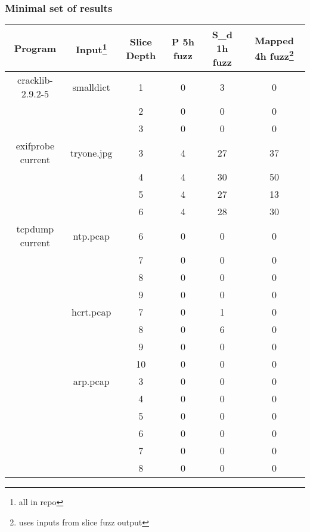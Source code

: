 \documentclass{beamer}
\begin{document}
\frame
{
	\frametitle{Minimal set of results}
	\tiny

	
	\begin{center}
	\begin{tabular}{| c | c | c  | c | c | c |}
	\hline
	Program            & Input\footnote{all in repo}        & Slice Depth  & P 5h fuzz & S\_d 1h fuzz & Mapped 4h fuzz\footnote{uses inputs from slice fuzz output} \\ \hline
	cracklib-2.9.2-5 & smalldict   &  1                 & 0             & 3                    & 0  \\
	                 	&                  &  2 		  & 0 		   & 0 			& 0  \\
	                 	&             	   & 	3 		 & 0 		   & 0 			& 0  \\ \hline
	exifprobe current & tryone.jpg & 3 		 & 4 		   & 27 			& 37  \\ 
	                  &            & 4 & 4 & 30 & 50  \\ 
	                  &            & 5 & 4 & 27 & 13  \\ 
	                  &            & 6 & 4 & 28 & 30  \\ \hline
	tcpdump current   & ntp.pcap   & 6 & 0 & 0 & 0   \\ 
	                  &   & 7 & 0 & 0 & 0   \\ 
	                  &    & 8 & 0 & 0 & 0   \\ 
	                  &    & 9 & 0 & 0 & 0   \\ \cline{2-6}
                      & hcrt.pcap  & 7 & 0 & 1 & 0   \\
                      &            & 8 & 0 & 6 & 0   \\ 
                      &            & 9 & 0 & 0 & 0   \\
                      &            & 10 & 0 & 0 & 0  \\ \cline{2-6}
                      & arp.pcap   & 3 & 0 & 0 & 0  \\ 
                      &    & 4 & 0 & 0 & 0  \\                    
                      &    & 5 & 0 & 0 & 0  \\ 
                      &    & 6 & 0 & 0 & 0  \\
                      &    & 7 & 0 & 0 & 0  \\
                      &    & 8 & 0 & 0 & 0  \\ \hline                                                                 
	\end{tabular}
	\end{center}


}
\end{document}
